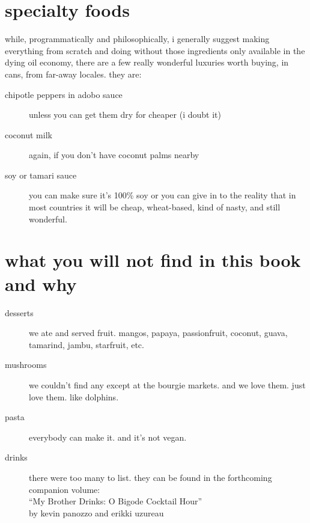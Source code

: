 \section{specialty foods}

while, programmatically and philosophically, i generally suggest
making everything from scratch and doing without those ingredients
only available in the dying oil economy, there are a few really
wonderful luxuries worth buying, in cans, from far-away locales. they
are:

\begin{description}

  \item[chipotle peppers in adobo sauce] unless you can get them dry
  for cheaper (i doubt it)

  \item[coconut milk] again, if you don't have coconut palms nearby

  \item[soy or tamari sauce] you can make sure it's 100\% soy or you
  can give in to the reality that in most countries it will be cheap,
  wheat-based, kind of nasty, and still wonderful.

\end{description}

\section{what you will not find in this book and why}

\begin{description}

  \item[desserts] we ate and served fruit.  mangos, papaya,
  passionfruit, coconut, guava, tamarind, jambu, starfruit, etc.

  \item[mushrooms] we couldn't find any except at the bourgie
  markets. and we love them. just love them. like dolphins.

  \item[pasta] everybody can make it. and it's not vegan.

  \item[drinks] there were too many to list. they can be found in the
  forthcoming companion volume:\\``My Brother Drinks: O Bigode Cocktail
  Hour''\\by kevin panozzo and erikki uzureau

\end{description}

